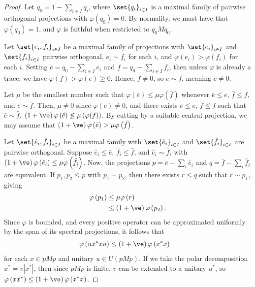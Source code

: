 \documentclass[10pt]{mypackage}
\begin{document}
\begin{proof}
  Let $q_0 = 1-\sum_{i\in I}q_i$, where $\set{q_i}_{i\in I}$ is a maximal family of pairwise orthogonal projections with $\varphi\left( q_0 \right) = 0$. By normality, we must have that $\varphi\left( q_0 \right) = 1$, and $\varphi$ is faithful when restricted to $q_0Mq_0$.

  Let $\set{e_i,f_i}_{i\in I}$ be a maximal family of projections with $\set{e_i}_{i\in I}$ and $\set{f_i}_{i\in I}$ pairwise orthogonal, $e_i\sim f_i$ for each $i$, and $\varphi\left( e_i \right) > \varphi\left( f_i \right)$ for each $i$. Setting $e = q_0 - \sum_{i\in I}e_i$ and $f = q_0 - \sum_{i\in I}f_i$, then unless $\varphi$ is already a trace, we have $\varphi(f) > \varphi(e) \geq 0$. Hence, $f\neq 0$, so $e\sim f$, meaning $e\neq 0$.

  Let $\mu$ be the smallest number such that $\varphi\left( \bar{e} \right)\leq \mu\varphi\left( \bar{f} \right)$ whenever $\bar{e}\leq e$, $\bar{f}\leq f$, and $\bar{e}\sim\bar{f}$. Then, $\mu\neq 0$ since $\varphi(e)\neq 0$, and there exists $\bar{e}\leq e$, $\bar{f}\leq f$ such that $\bar{e}\sim \bar{f}$, $\left( 1+\ve \right)\varphi\left( \bar{e} \right)\not\leq \mu\left( \varphi(f) \right)$. By cutting by a suitable central projection, we may assume that $\left( 1+\ve \right)\varphi\left( \bar{e} \right) > \mu\varphi\left( \bar{f} \right)$.

  Let $\set{\hat{e}_i,\hat{f}_i}_{i\in I}$ be a maximal family with $\set{\hat{e}_i}_{i\in I}$ and $\set{\hat{f}_{i}}_{i\in I}$ are pairwise orthogonal. Suppose $\hat{e}_i\leq \bar{e}$, $\hat{f}_i\leq \bar{f}$, and $\hat{e}_i\sim \hat{f}_i$ with $\left( 1+\ve \right)\varphi\left( \hat{e}_i \right)\leq \mu\varphi\left( \hat{f}_i \right)$. Now, the projections $p = \bar{e}-\sum_{i}\hat{e}_i$ and $q = \bar{f}-\sum_{i}\hat{f}_i$ are equivalent. If $p_1,p_2\leq p$ with $p_1\sim p_2$, then there exists $r\leq q$ such that $r\sim p_1$, giving
  \begin{align*}
    \varphi\left( p_1 \right) &\leq \mu\varphi\left( r \right)\\
                              &\leq \left( 1+\ve \right)\varphi\left( p_2 \right).
  \end{align*}
  Since $\varphi$ is bounded, and every positive operator can be approximated uniformly by the span of its spectral projections, it follows that
  \begin{align*}
    \varphi\left( ux^{\ast}xu \right) &\leq \left( 1+\ve \right)\varphi\left( x^{\ast}x \right)
  \end{align*}
  for each $x\in pMp$ and unitary $u\in U\left( pMp \right)$. If we take the polar decomposition $x^{\ast} = v\left\vert x^{\ast} \right\vert$, then since $pMp$ is finite, $v$ can be extended to a unitary $u^{\ast}$, so $\varphi\left( xx^{\ast} \right)\leq \left( 1+\ve \right)\varphi\left( x^{\ast}x \right)$.
\end{proof}
\end{document}
